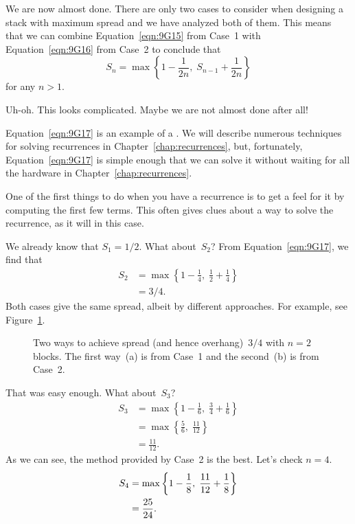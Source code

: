 We are now almost done.  There are only two cases to consider when
designing a stack with maximum spread and we have analyzed both of
them.  This means that we can combine Equation~\ref{eqn:9G15} from
Case~1 with Equation~\ref{eqn:9G16} from Case~2 to conclude that
\begin{equation}\label{eqn:9G17}
    S_n = \max \left\{ 1 - \frac{1}{2n}, \; S_{n - 1} + \frac{1}{2n} \right\}
\end{equation}
for any $n > 1$.

Uh-oh. This looks complicated.  Maybe we are not almost done after
all!

Equation~\ref{eqn:9G17} is an example of a .  We will
describe numerous techniques for solving recurrences in
Chapter~\ref{chap:recurrences}, but, fortunately,
Equation~\ref{eqn:9G17} is simple enough that we can solve it without
waiting for all the hardware in Chapter~\ref{chap:recurrences}.

One of the first things to do when you have a recurrence is to get a
feel for it by computing the first few terms.  This often gives clues
about a way to solve the recurrence, as it will in this case.

We already know that $S_1 = 1/2$.  What about~$S_2$?  From
Equation~\ref{eqn:9G17}, we find that
\begin{align*}
S_2
    &= \max \left\{ 1 - \frac{1}{4}, \; \frac{1}{2} + \frac{1}{4} \right \} \\
    &= 3/4.
\end{align*}
Both cases give the same spread, albeit by different approaches.  For
example, see Figure~\ref{fig:9G20}.

\begin{figure}

\qquad
{}

\caption{Two ways to achieve spread (and hence overhang)~$3/4$ with $n
  = 2$ blocks.  The first way~(a) is from Case~1 and the second~(b) is
  from Case~2.}

\label{fig:9G20}

\end{figure}

That was easy enough.  What about~$S_3$?
\begin{align*}
S_3 &= \max\left\{ 1 - \frac{1}{6}, \; \frac{3}{4} + \frac{1}{6} \right\} \\
    &= \max\left\{ \frac{5}{6}, \; \frac{11}{12} \right\} \\
    &= \frac{11}{12}.
\end{align*}
As we can see, the method provided by Case~2 is the best.  Let's check
$n = 4$.
\begin{align}
S_4 &= \max\left\{ 1 - \frac{1}{8}, \; \frac{11}{12} + \frac{1}{8} \right\}
    \notag \\
    &= \frac{25}{24}. \label{eqn:9G21}
\end{align}

